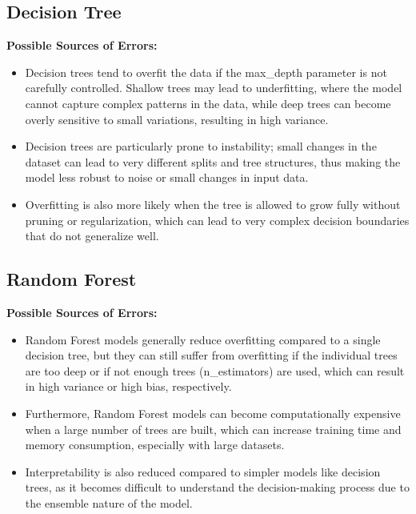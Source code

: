 \documentclass[12pt]{report}
\begin{document}
\subsection{Decision Tree}

\textbf{Possible Sources of Errors:} 
\begin{itemize}
    \item Decision trees tend to overfit the data if the max\_depth parameter is not carefully controlled. Shallow trees may lead to underfitting, where the model cannot capture complex patterns in the data, while deep trees can become overly sensitive to small variations, resulting in high variance.
    \item Decision trees are particularly prone to instability; small changes in the dataset can lead to very different splits and tree structures, thus making the model less robust to noise or small changes in input data.
    \item Overfitting is also more likely when the tree is allowed to grow fully without pruning or regularization, which can lead to very complex decision boundaries that do not generalize well.
\end{itemize}

\subsection{Random Forest}
\textbf{Possible Sources of Errors:} 
\begin{itemize}
    \item Random Forest models generally reduce overfitting compared to a single decision tree, but they can still suffer from overfitting if the individual trees are too deep or if not enough trees (n\_estimators) are used, which can result in high variance or high bias, respectively.
    \item Furthermore, Random Forest models can become computationally expensive when a large number of trees are built, which can increase training time and memory consumption, especially with large datasets.
    \item Interpretability is also reduced compared to simpler models like decision trees, as it becomes difficult to understand the decision-making process due to the ensemble nature of the model.
\end{itemize}
\end{document}
